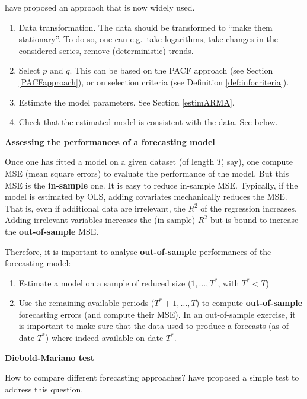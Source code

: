 \documentclass[
  11pt,
]{book}
\providecommand{\tightlist}{%
  \setlength{\itemsep}{0pt}\setlength{\parskip}{0pt}}
\theoremstyle{definition}
\theoremstyle{definition}
\theoremstyle{definition}
\theoremstyle{definition}
\theoremstyle{remark}
\begin{document}
\citet{boxjen76} have proposed an approach that is now widely used.

\begin{enumerate}
\def\labelenumi{\arabic{enumi}.}
\tightlist
\item
  Data transformation. The data should be transformed to ``make them stationary''. To do so, one can e.g.~take logarithms, take changes in the considered series, remove (deterministic) trends.
\item
  Select \(p\) and \(q\). This can be based on the PACF approach (see Section \ref{PACFapproach}), or on selection criteria (see Definition \ref{def:infocriteria}).
\item
  Estimate the model parameters. See Section \ref{estimARMA}.
\item
  Check that the estimated model is consistent with the data. See below.
\end{enumerate}

\textbf{Assessing the performances of a forecasting model}

Once one has fitted a model on a given dataset (of length \(T\), say), one compute MSE (mean square errors) to evaluate the performance of the model. But this MSE is the \textbf{in-sample} one. It is easy to reduce in-sample MSE. Typically, if the model is estimated by OLS, adding covariates mechanically reduces the MSE. That is, even if additional data are irrelevant, the \(R^2\) of the regression increases. Adding irrelevant variables increases the (in-sample) \(R^2\) but is bound to increase the \textbf{out-of-sample} MSE.

Therefore, it is important to analyse \textbf{out-of-sample} performances of the forecasting model:

\begin{enumerate}
\def\labelenumi{\alph{enumi}.}
\tightlist
\item
  Estimate a model on a sample of reduced size (\(1,\dots,T^*\), with \(T^*<T\))
\item
  Use the remaining available periods (\(T^*+1,\dots,T\)) to compute \textbf{out-of-sample} forecasting errors (and compute their MSE). In an out-of-sample exercise, it is important to make sure that the data used to produce a forecasts (as of date \(T^*\)) where indeed available on date \(T^*\).
\end{enumerate}

\textbf{Diebold-Mariano test}

How to compare different forecasting approaches? \citet{Diebold_Mariano_1995} have proposed a simple test to address this question.
\end{document}
